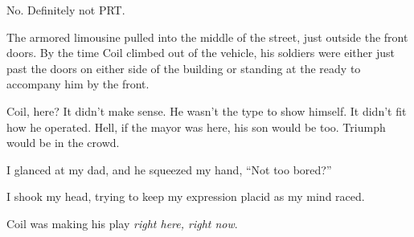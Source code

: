 No.  Definitely not PRT.



The armored limousine pulled into the middle of the street, just outside the front doors.  By the time Coil climbed out of the vehicle, his soldiers were either just past the doors on either side of the building or standing at the ready to accompany him by the front.



Coil, here?  It didn't make sense.  He wasn't the type to show himself.  It didn't fit how he operated.  Hell, if the mayor was here, his son would be too.  Triumph would be in the crowd.



I glanced at my dad, and he squeezed my hand, ``Not too bored?''



I shook my head, trying to keep my expression placid as my mind raced.



Coil was making his play \emph{right here, right now}.





